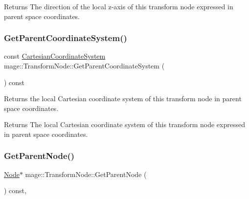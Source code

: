 \begin{DoxyReturn}{Returns}
The direction of the local z-\/axis of this transform node expressed in parent space coordinates. 
\end{DoxyReturn}
\hypertarget{structmage_1_1_transform_node_af99de109dd3e211fdc5f06a65ccc1e89}{}\label{structmage_1_1_transform_node_af99de109dd3e211fdc5f06a65ccc1e89} 
\subsubsection{\texorpdfstring{Get\+Parent\+Coordinate\+System()}{GetParentCoordinateSystem()}}
{\footnotesize\ttfamily const \hyperlink{structmage_1_1_cartesian_coordinate_system}{Cartesian\+Coordinate\+System} mage\+::\+Transform\+Node\+::\+Get\+Parent\+Coordinate\+System (\begin{DoxyParamCaption}{ }\end{DoxyParamCaption}) const\hspace{0.3cm}{\ttfamily [noexcept]}}

Returns the local Cartesian coordinate system of this transform node in parent space coordinates.

\begin{DoxyReturn}{Returns}
The local Cartesian coordinate system of this transform node expressed in parent space coordinates. 
\end{DoxyReturn}
\hypertarget{structmage_1_1_transform_node_a63ed2249e0629f0874da5095c0deb705}{}\label{structmage_1_1_transform_node_a63ed2249e0629f0874da5095c0deb705} 
\subsubsection{\texorpdfstring{Get\+Parent\+Node()}{GetParentNode()}}
{\footnotesize\ttfamily \hyperlink{classmage_1_1_node}{Node}$\ast$ mage\+::\+Transform\+Node\+::\+Get\+Parent\+Node (\begin{DoxyParamCaption}{ }\end{DoxyParamCaption}) const\hspace{0.3cm}{\ttfamily [private]}, {\ttfamily [noexcept]}}

